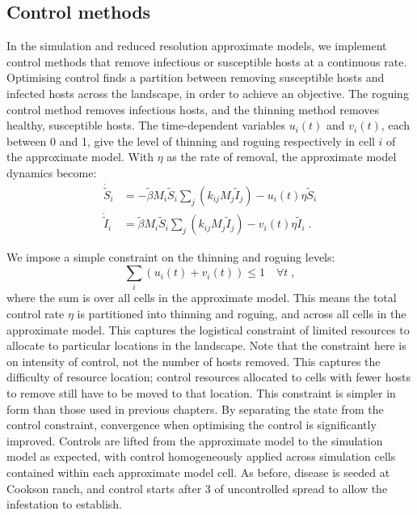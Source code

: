 \subsection{Control methods}

In the simulation and reduced resolution approximate models, we implement control methods that remove infectious or susceptible hosts at a continuous rate. Optimising control finds a partition between removing susceptible hosts and infected hosts across the landscape, in order to achieve an objective. The roguing control method removes infectious hosts, and the thinning method removes healthy, susceptible hosts. The time-dependent variables $u_i(t)$ and $v_i(t)$, each between 0 and 1, give the level of thinning and roguing respectively in cell $i$ of the approximate model. With $\eta$ as the rate of removal, the approximate model dynamics become:
\begin{subequations}
    \begin{align}
        \dot{\tilde{S}}_i &= -\tilde{\beta}M_i\tilde{S}_i\sum_j\left(k_{ij}M_j\tilde{I}_j\right) - u_i(t)\eta{}\tilde{S}_i\\
        \dot{\tilde{I}}_i &= \tilde{\beta}M_i\tilde{S}_i\sum_j\left(k_{ij}M_j\tilde{I}_j\right) - v_i(t)\eta{}\tilde{I}_i\;.
    \end{align}
\end{subequations}

We impose a simple constraint on the thinning and roguing levels:
\begin{equation}
    \sum_i\left(u_i(t) + v_i(t)\right) \leq 1 \quad \forall t\;,
\end{equation}
where the sum is over all cells in the approximate model. This means the total control rate $\eta$ is partitioned into thinning and roguing, and across all cells in the approximate model. This captures the logistical constraint of limited resources to allocate to particular locations in the landscape. Note that the constraint here is on intensity of control, not the number of hosts removed. This captures the difficulty of resource location; control resources allocated to cells with fewer hosts to remove still have to be moved to that location. This constraint is simpler in form than those used in previous chapters. By separating the state from the control constraint, convergence when optimising the control is significantly improved. Controls are lifted from the approximate model to the simulation model as expected, with control homogeneously applied across simulation cells contained within each approximate model cell. As before, disease is seeded at Cookson ranch, and control starts after \SI{3}{\years} of uncontrolled spread to allow the infestation to establish.

